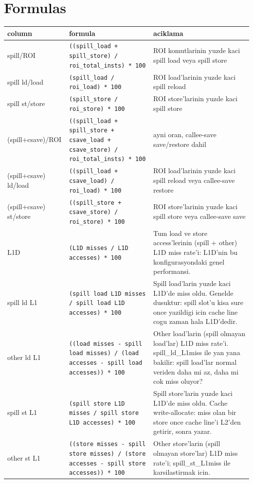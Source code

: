 \documentclass[10pt,a4paper,landscape]{article}
\begin{document}
\section*{Formulas}
{\footnotesize
\begin{longtable}{lp{11cm}p{10cm}}
\toprule
column & formula & aciklama \\
\midrule
\endhead
\bottomrule
\endfoot
spill/ROI & \texttt{((spill\_load + spill\_store) / roi\_total\_insts) * 100} & ROI komutlarinin yuzde kaci spill load veya spill store \\
spill ld/load & \texttt{(spill\_load / roi\_load) * 100} & ROI load'larinin yuzde kaci spill reload \\
spill st/store & \texttt{(spill\_store / roi\_store) * 100} & ROI store'larinin yuzde kaci spill store \\
(spill+csave)/ROI & \texttt{((spill\_load + spill\_store + csave\_load + csave\_store) / roi\_total\_insts) * 100} & ayni oran, callee-save save/restore dahil \\
(spill+csave) ld/load & \texttt{((spill\_load + csave\_load) / roi\_load) * 100} & ROI load'larinin yuzde kaci spill reload veya callee-save restore \\
(spill+csave) st/store & \texttt{((spill\_store + csave\_store) / roi\_store) * 100} & ROI store'larinin yuzde kaci spill store veya callee-save save \\
L1D & \texttt{(L1D misses / L1D accesses) * 100} & Tum load ve store access'lerinin (spill + other) L1D miss rate'i: L1D'nin bu konfigurasyondaki genel performansi. \\
spill ld L1 & \texttt{(spill load L1D misses / spill load L1D accesses) * 100} & Spill load'larin yuzde kaci L1D'de miss oldu. Genelde dusuktur: spill slot'u kisa sure once yazildigi icin cache line cogu zaman hala L1D'dedir. \\
other ld L1 & \texttt{((load misses - spill load misses) / (load accesses - spill load accesses)) * 100} & Other load'larin (spill olmayan load'lar) L1D miss rate'i. spill\_ld\_L1miss ile yan yana bakilir: spill load'lar normal veriden daha mi az, daha mi cok miss oluyor? \\
spill st L1 & \texttt{(spill store L1D misses / spill store L1D accesses) * 100} & Spill store'larin yuzde kaci L1D'de miss oldu. Cache write-allocate: miss olan bir store once cache line'i L2'den getirir, sonra yazar. \\
other st L1 & \texttt{((store misses - spill store misses) / (store accesses - spill store accesses)) * 100} & Other store'larin (spill olmayan store'lar) L1D miss rate'i; spill\_st\_L1miss ile karsilastirmak icin. \\

\end{longtable}}
\end{document}
